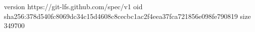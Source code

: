 version https://git-lfs.github.com/spec/v1
oid sha256:378d540fc8069dc34c15d4608c8cecbc1ac2f4eea37fca721856e098fe790819
size 349700

